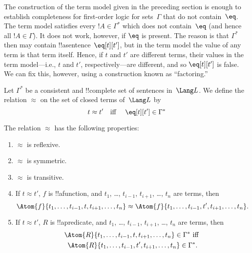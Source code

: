 \documentclass[../../../include/open-logic-section]{subfiles}
\begin{document}

\begin{explain}
The construction of the term model given in the preceding section is
enough to establish completeness for first-order logic for
sets~$\Gamma$ that do not contain~$\eq$.  The term model satisfies
every $!A \in \Gamma^*$ which does not contain~$\eq$ (and hence all
$!A \in \Gamma$).  It does not work, however, if $\eq$ is present.
The reason is that $\Gamma^*$ then may contain
!!a{sentence}~$\eq[t][t']$, but in the term model the value of any
term is that term itself.  Hence, if $t$ and $t'$ are different terms,
their values in the term model---i.e., $t$ and $t'$,
respectively---are different, and so $\eq[t][t']$ is false.  We can
fix this, however, using a construction known as ``factoring.''
\end{explain}

\begin{defn}
  Let $\Gamma^*$ be a consistent and !!{complete} set of sentences
  in~$\Lang L$.  We define the relation $\approx$ on the set of closed
  terms of~$\Lang L$ by
  \[
  t \approx t' \text{\quad iff \quad} \eq[t][t'] \in \Gamma^*
  \]
\end{defn}

\begin{prop}
The relation $\approx$ has the following properties:
\begin{enumerate}
\item $\approx$ is reflexive.
\item $\approx$ is symmetric.
\item  $\approx$ is transitive.
\item If $t \approx t'$, $f$ is !!a{function}, and $t_1$, \dots,
  $t_{i-1}$, $t_{i+1}$, \dots, $t_n$ are terms, then
\[
\Atom{f}{t_1,\dots, t_{i-1}, t, t_{i+1}, \dots, t_n} \approx
\Atom{f}{t_1,\dots, t_{i-1}, t', t_{i+1}, \dots, t_n}.
\]
\item If $t \approx t'$, $R$ is !!a{predicate}, and $t_1$, \dots,
  $t_{i-1}$, $t_{i+1}$, \dots, $t_n$ are terms, then
\begin{multline*}
\Atom{R}{t_1,\dots, t_{i-1}, t, t_{i+1}, \dots, t_n} \in \Gamma^* \text{ iff } \\
\Atom{R}{t_1,\dots, t_{i-1}, t', t_{i+1}, \dots, t_n} \in \Gamma^*.
\end{multline*}
\end{enumerate}
\end{prop}
\end{document}
